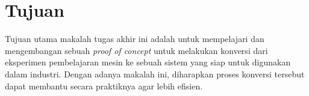 \section{Tujuan}

Tujuan utama makalah tugas akhir ini adalah untuk mempelajari dan mengembangan sebuah \textit{proof of concept} untuk melakukan konversi dari eksperimen pembelajaran mesin ke sebuah sistem yang siap untuk digunakan dalam industri.
Dengan adanya makalah ini, diharapkan proses konversi tersebut dapat membantu secara praktiknya agar lebih efisien.